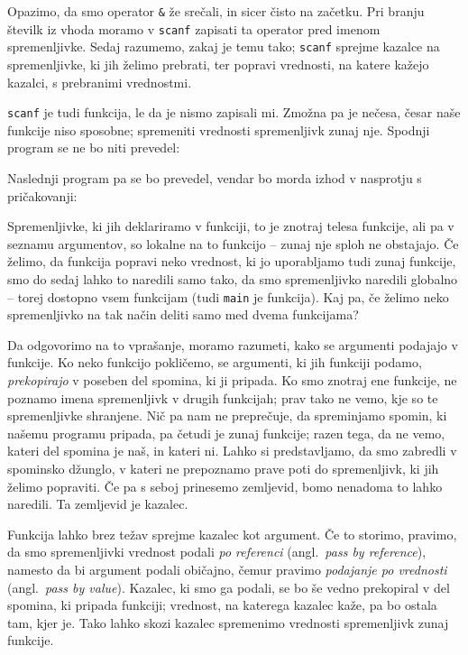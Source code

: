 Opazimo, da smo operator \verb+&+ že srečali, in sicer čisto na začetku.
Pri branju številk iz vhoda moramo v \verb+scanf+ zapisati ta operator pred
imenom spremenljivke. Sedaj razumemo, zakaj je temu tako; \verb+scanf+ sprejme
kazalce na spremenljivke, ki jih želimo prebrati, ter popravi vrednosti, na
katere kažejo kazalci, s prebranimi vrednostmi.

\begin{examples}
  \verb+scanf+ je tudi funkcija, le da je nismo zapisali mi.
  Zmožna pa je nečesa, česar naše funkcije niso sposobne; spremeniti vrednosti
  spremenljivk zunaj nje. Spodnji program se ne bo niti prevedel:


  Naslednji program pa se bo prevedel, vendar bo morda izhod v nasprotju s
  pričakovanji:


  \begin{inout}
  \end{inout}
\end{examples}

Spremenljivke, ki jih deklariramo v funkciji, to je znotraj telesa funkcije,
ali pa v seznamu argumentov, so lokalne na to funkcijo -- zunaj nje sploh ne
obstajajo. Če želimo, da funkcija popravi neko vrednost, ki jo uporabljamo tudi
zunaj funkcije, smo do sedaj lahko to naredili samo tako, da smo spremenljivko
naredili globalno -- torej dostopno vsem funkcijam
(tudi \verb+main+ je funkcija). Kaj pa, če želimo neko spremenljivko na tak
način deliti samo med dvema funkcijama?

Da odgovorimo na to vprašanje, moramo razumeti, kako se argumenti podajajo v
funkcije. Ko neko funkcijo pokličemo, se argumenti, ki jih funkciji podamo,
\emph{prekopirajo} v poseben del spomina, ki ji pripada. Ko smo znotraj ene
funkcije, ne poznamo imena spremenljivk v drugih funkcijah; prav tako ne vemo,
kje so te spremenljivke shranjene. Nič pa nam ne preprečuje, da spreminjamo
spomin, ki našemu programu pripada, pa četudi je zunaj funkcije;
razen tega, da ne vemo, kateri del spomina je naš, in kateri ni.
Lahko si predstavljamo, da smo zabredli v spominsko džunglo, v kateri
ne prepoznamo prave poti do spremenljivk, ki jih želimo popraviti. Če pa s seboj
prinesemo zemljevid, bomo nenadoma to lahko naredili. Ta zemljevid je kazalec.

Funkcija lahko brez težav sprejme kazalec kot argument. Če to storimo, pravimo,
da smo spremenljivki vrednost podali \emph{po referenci}
(angl.~\textit{pass by reference}), namesto da bi argument podali običajno,
čemur pravimo \emph{podajanje po vrednosti} (angl.~\textit{pass by value}).
Kazalec, ki smo ga podali, se bo še vedno prekopiral v del spomina, ki pripada
funkciji; vrednost, na katerega kazalec kaže, pa bo ostala tam, kjer je.
Tako lahko skozi kazalec spremenimo vrednosti spremenljivk zunaj funkcije.

